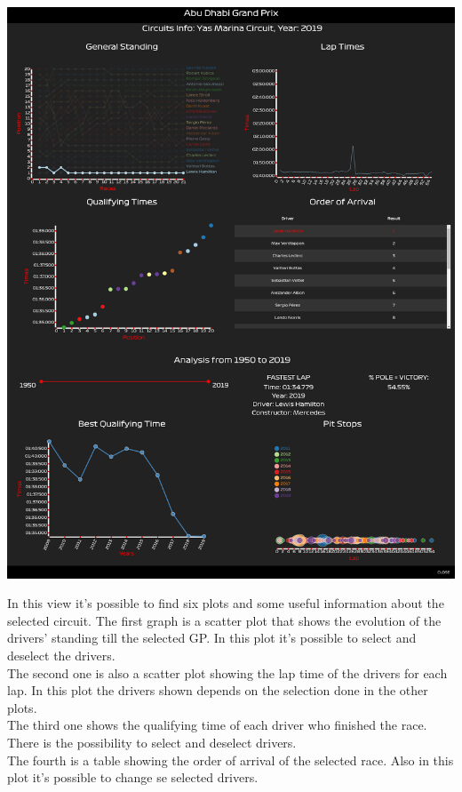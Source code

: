 \documentclass[11pt,twocolumn,letterpaper]{article}
\begin{document}
\begin{center}
	\centering
	\includegraphics[width=\columnwidth]{map-clicked}
\end{center}
In this view it's possible to find six plots and some useful information about the selected circuit.
The first graph is a scatter plot that shows the evolution of the drivers' standing till the selected GP. In this plot it's possible to select and deselect the drivers. \\
The second one is also a scatter plot showing the lap time of the drivers for each lap. In this plot the drivers shown depends on the selection done in the other plots.\\
The third one shows the qualifying time of each driver who finished the race. There is the possibility to select and deselect drivers.\\
The fourth is a table showing the order of arrival of the selected race. Also in this plot it's possible to change se selected drivers.\\
\end{document}
